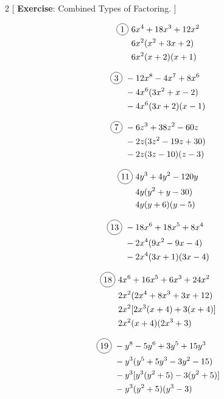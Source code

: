 \newpage

\begin{multicols}{2}
[
  \textbf{Exercise}: Combined Types of Factoring.
]

\begin{align*}
  \circled{1}\ &6x^{4}+18x^{3}+12x^{2}\\
  &6x^{2}(x^{2}+3x+2)\\
  &6x^{2}(x+2)(x+1)
\end{align*}

\begin{align*}
  \circled{3}\ &-12x^{8}-4x^{7}+8x^{6}\\
  &-4x^{6}(3x^{2}+x-2)\\
  &-4x^{6}(3x+2)(x-1)
\end{align*}

\begin{align*}
  \circled{7}\ &-6z^{3}+38z^{2}-60z\\
  &-2z(3z^{2}-19z+30)\\
  &-2z(3z-10)(z-3)
\end{align*}

\begin{align*}
  \circled{11}\ &4y^{3}+4y^{2}-120y\\
  &4y(y^{2}+y-30)\\
  &4y(y+6)(y-5)
\end{align*}

\begin{align*}
  \circled{13}\ &-18x^{6}+18x^{5}+8x^{4}\\
  &-2x^{4}(9x^{2}-9x-4)\\
  &-2x^{4}(3x+1)(3x-4)
\end{align*}

\begin{align*}
  \circled{18}\ &4x^{6}+16x^{5}+6x^{3}+24x^{2}\\
  &2x^{2}(2x^{4}+8x^{3}+3x+12)\\
  &2x^{2}[2x^{3}(x+4)+3(x+4)]\\
  &2x^{2}(x+4)(2x^{3}+3)\
\end{align*}

\begin{align*}
  \circled{19}\ &-y^{8}-5y^{6}+3y^{5}+15y^{3}\\
  &-y^{3}(y^{5}+5y^{3}-3y^{2}-15)\\
  &-y^{3}[y^{3}(y^{2}+5)-3(y^{2}+5)]\\
  &-y^{3}(y^{2}+5)(y^{3}-3)\
\end{align*}


\end{multicols}
